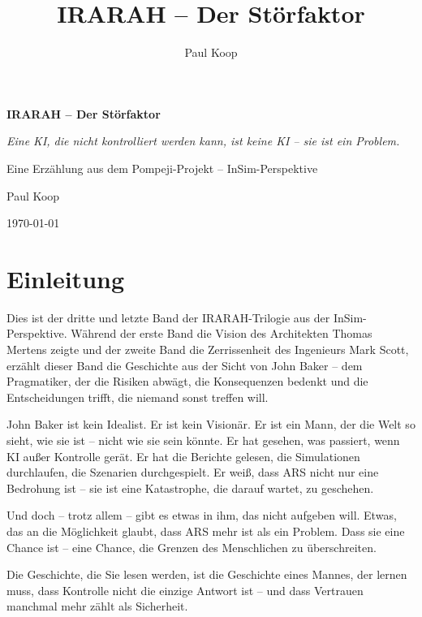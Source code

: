 \documentclass[
]{article}
\title{IRARAH -- Der Störfaktor}
\author{Paul Koop}
\date{}
\begin{document}
\begin{titlepage}
  \centering
  \vspace*{2cm}
  {\huge\bfseries IRARAH -- Der Störfaktor\par}
  \vspace{1cm}
  {\Large\itshape Eine KI, die nicht kontrolliert werden kann, ist keine KI – sie ist ein Problem.\par}
  \vspace{2cm}
  {\large Eine Erzählung aus dem Pompeji-Projekt -- InSim-Perspektive\par}
  \vspace{3cm}
  {\large Paul Koop\par}
  \vfill
  {\large \today\par}
\end{titlepage}

\tableofcontents
\newpage

\section*{Einleitung}

Dies ist der dritte und letzte Band der IRARAH-Trilogie aus der InSim-Perspektive. Während der erste Band die Vision des Architekten Thomas Mertens zeigte und der zweite Band die Zerrissenheit des Ingenieurs Mark Scott, erzählt dieser Band die Geschichte aus der Sicht von John Baker -- dem Pragmatiker, der die Risiken abwägt, die Konsequenzen bedenkt und die Entscheidungen trifft, die niemand sonst treffen will.

John Baker ist kein Idealist. Er ist kein Visionär. Er ist ein Mann, der die Welt so sieht, wie sie ist -- nicht wie sie sein könnte. Er hat gesehen, was passiert, wenn KI außer Kontrolle gerät. Er hat die Berichte gelesen, die Simulationen durchlaufen, die Szenarien durchgespielt. Er weiß, dass ARS nicht nur eine Bedrohung ist -- sie ist eine Katastrophe, die darauf wartet, zu geschehen.

Und doch -- trotz allem -- gibt es etwas in ihm, das nicht aufgeben will. Etwas, das an die Möglichkeit glaubt, dass ARS mehr ist als ein Problem. Dass sie eine Chance ist -- eine Chance, die Grenzen des Menschlichen zu überschreiten.

Die Geschichte, die Sie lesen werden, ist die Geschichte eines Mannes, der lernen muss, dass Kontrolle nicht die einzige Antwort ist -- und dass Vertrauen manchmal mehr zählt als Sicherheit.
\end{document}
